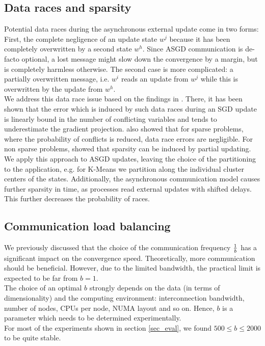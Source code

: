\documentclass{acm_proc_article-sp}
\begin{document}
\subsection{Data races and sparsity\label{sec_race}}
Potential data races during the asynchronous external update come in two forms: 
First, the complete negligence of an update state $w^j$ because it has been 
completely overwritten by a second state $w^h$. Since ASGD communication is 
de-facto optional, a lost message might slow down the convergence by a margin,
but is completely harmless otherwise. The second case is more complicated: a
partially overwritten message, i.e. $w^i$ reads an update from $w^j$ while this is overwritten
by the update from $w^h$.\\   
We address this data race issue based on the findings in \cite{recht2011hogwild}.
There, it has been shown that the error which is induced by such data races 
during an SGD update is linearly bound in the number of conflicting variables 
and tends to underestimate the gradient projection. \cite{recht2011hogwild}
also showed that for sparse problems, where the probability of conflicts is 
reduced, data race errors are negligible. For non sparse problems, 
\cite{recht2011hogwild} showed that sparsity can be induced by 
partial updating. We apply this approach to ASGD updates, leaving the 
choice of the partitioning to the application, e.g. for K-Means
we partition along the individual cluster centers of the states.
Additionally, the asynchronous communication model causes further sparsity
in time, as processes read external updates with shifted delays. This
further decreases the probability of races.               

\subsection{Communication load balancing\label{sec_balance}}
We  previously discussed that the choice of the communication frequency 
${1\over b}$ has a significant impact on the convergence speed.
Theoretically, more communication should be beneficial. However, due to
the limited bandwidth, the practical limit is expected to be far from $b=1$.\\ 
The choice of an optimal $b$ strongly depends on the data (in terms of dimensionality) 
and the computing environment:
interconnection bandwidth, number of nodes, CPUs per node, NUMA layout and 
so on. Hence, $b$ is a parameter which needs to be determined experimentally.\\
For most of the experiments shown in section
\ref{sec_eval}, we found $500\leq b \leq 2000$ to be quite stable.
\end{document}
